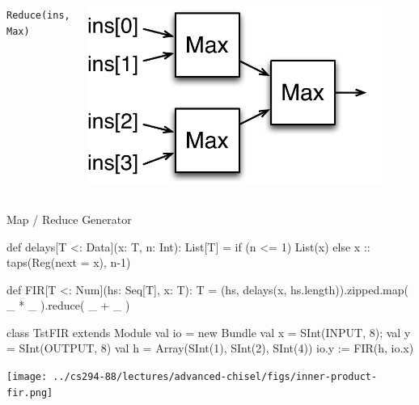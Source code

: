 \documentclass[xcolor=pdflatex,dvipsnames,table]{beamer}
\begin{document}
\begin{frame}
\begin{Large}
\begin{columns}
\verb+Reduce(ins, Max)+ \\
\begin{center}
\includegraphics[width=0.9\textwidth]{../bootcamp/figs/reduce.pdf} \\
\end{center}

\end{columns}

\end{Large}
\end{frame}

\begin{frame}[fragile]{Map / Reduce Generator}
\begin{footnotesize}
\begin{scala}
def delays[T <: Data](x: T, n: Int): List[T] = 
  if (n <= 1) List(x) else x :: taps(Reg(next = x), n-1)

def FIR[T <: Num](hs: Seq[T], x: T): T = 
  (hs, delays(x, hs.length)).zipped.map( _ * _ ).reduce( _ + _ )

class TstFIR extends Module {
  val io = new Bundle{ val x  = SInt(INPUT, 8); val y = SInt(OUTPUT, 8) }
  val h  = Array(SInt(1), SInt(2), SInt(4))
  io.y  := FIR(h, io.x)
}
\end{scala}
\end{footnotesize}
\begin{center}
\texttt{[image: ../cs294-88/lectures/advanced-chisel/figs/inner-product-fir.png]} 
\end{center}
\end{frame}
\end{document}
